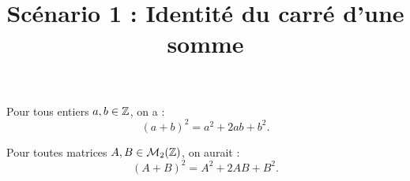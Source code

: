 \documentclass[11pt,a4paper]{article}
\title{Scénario 1 : Identité du carré d'une somme}
\begin{document}
\maketitle

\begin{proposition}
Pour tous entiers $a, b \in \mathbb{Z}$, on a :
\[
  (a + b)^2 = a^2 + 2ab + b^2.
\]
\end{proposition}

\begin{proposition}
Pour toutes matrices $A, B \in \mathcal{M}_2(\mathbb{Z})$, on aurait :
\[
  (A + B)^2 = A^2 + 2AB + B^2.
\]
\end{proposition}
\end{document}
